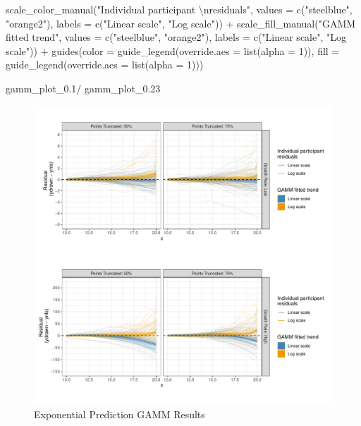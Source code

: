 \documentclass[print]{nuthesis}
\newenvironment{Shaded}{\begin{snugshade}}{\end{snugshade}}
\newcommand{\AttributeTok}[1]{\textcolor[rgb]{0.77,0.63,0.00}{#1}}
\newcommand{\DecValTok}[1]{\textcolor[rgb]{0.00,0.00,0.81}{#1}}
\newcommand{\FloatTok}[1]{\textcolor[rgb]{0.00,0.00,0.81}{#1}}
\newcommand{\FunctionTok}[1]{\textcolor[rgb]{0.00,0.00,0.00}{#1}}
\newcommand{\NormalTok}[1]{#1}
\newcommand{\SpecialCharTok}[1]{\textcolor[rgb]{0.00,0.00,0.00}{#1}}
\newcommand{\StringTok}[1]{\textcolor[rgb]{0.31,0.60,0.02}{#1}}
\begin{document}
\begin{Shaded}
\begin{Highlighting}[]
  \FunctionTok{scale\_color\_manual}\NormalTok{(}\StringTok{"Individual participant }\SpecialCharTok{\textbackslash{}n}\StringTok{residuals"}\NormalTok{, }\AttributeTok{values =} \FunctionTok{c}\NormalTok{(}\StringTok{"steelblue"}\NormalTok{, }\StringTok{"orange2"}\NormalTok{), }\AttributeTok{labels =} \FunctionTok{c}\NormalTok{(}\StringTok{"Linear scale"}\NormalTok{, }\StringTok{"Log scale"}\NormalTok{)) }\SpecialCharTok{+}
  \FunctionTok{scale\_fill\_manual}\NormalTok{(}\StringTok{"GAMM fitted trend"}\NormalTok{, }\AttributeTok{values =} \FunctionTok{c}\NormalTok{(}\StringTok{"steelblue"}\NormalTok{, }\StringTok{"orange2"}\NormalTok{), }\AttributeTok{labels =} \FunctionTok{c}\NormalTok{(}\StringTok{"Linear scale"}\NormalTok{, }\StringTok{"Log scale"}\NormalTok{)) }\SpecialCharTok{+}
  \FunctionTok{guides}\NormalTok{(}\AttributeTok{color =} \FunctionTok{guide\_legend}\NormalTok{(}\AttributeTok{override.aes =} \FunctionTok{list}\NormalTok{(}\AttributeTok{alpha =} \DecValTok{1}\NormalTok{)),}
         \AttributeTok{fill =} \FunctionTok{guide\_legend}\NormalTok{(}\AttributeTok{override.aes =} \FunctionTok{list}\NormalTok{(}\AttributeTok{alpha =} \DecValTok{1}\NormalTok{)))}

\NormalTok{gamm\_plot\_0}\FloatTok{.1}\SpecialCharTok{/}
\NormalTok{gamm\_plot\_0}\FloatTok{.23}
\end{Highlighting}
\end{Shaded}

\begin{figure}
\includegraphics[width=1\linewidth]{thesis_files/figure-latex/exponential-prediction-gamm-preds-1} \caption{Exponential Prediction GAMM Results}\label{fig:exponential-prediction-gamm-preds}
\end{figure}
\end{document}
